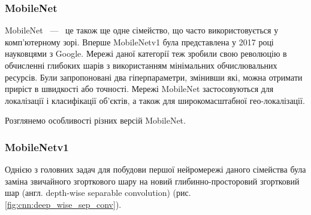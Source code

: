 \subsubsection{MobileNet}

MobileNet ~---~ це також ще одне сімейство, що часто використовується у комп'ютерному зорі.
Вперше MobileNetv1 \cite{mobilenetv1} була представлена у 2017 році науковцями з Google.
Мережі даної категорії теж зробили свою революцію в обчисленні глибоких шарів з
використанням мінімальних обчислювальних ресурсів. Були запропоновані два гіперпараметри,
змінивши які, можна отримати приріст в швидкості або точності. Мережі MobileNet
застосовуються для локалізації і класифікації об'єктів, а також для широкомасштабної
гео-локалізації.

Розглянемо особливості різних версій MobileNet.

\subsubsection{MobileNetv1}
Однією з головних задач для побудови першої нейромережі даного сімейства була заміна
звичайного згорткового шару на новий глибинно-просторовий згортковий шар
(англ. depth-wise separable convolution) (рис. \ref{fig:cnn:deep_wise_sep_conv}).

